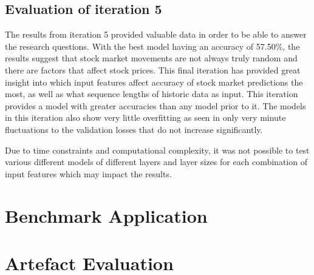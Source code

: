 \subsection{Evaluation of iteration 5}
The results from iteration 5 provided valuable data in order to be able to answer the research questions. With the best model having an accuracy
of 57.50\%, the results suggest that stock market movements are not always truly random and there are factors that affect stock prices. This
final iteration has provided great insight into which input features affect accuracy of stock market predictions the most, as well as what
sequence lengths of historic data as input. This iteration provides a model with greater accuracies than any model prior to it. The models in this
iteration also show very little overfitting as seen in only very minute fluctuations to the validation losses that do not increase significantly.

Due to time constraints and computational complexity, it was not possible to test various different models of different layers and layer sizes
for each combination of input features which may impact the results.

\section{Benchmark Application}


\section{Artefact Evaluation}

